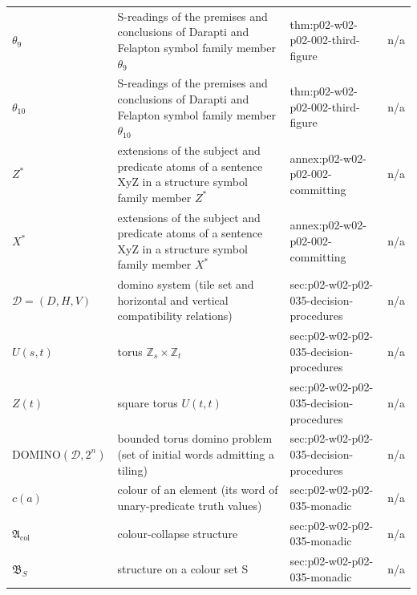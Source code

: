 \begin{longtable}{@{}p{}p{}p{}p{}@{}}
\(\theta_9\) & S-readings of the premises and conclusions of Darapti and Felapton symbol family member \(\theta_9\) & thm:\allowbreak{}p02-\allowbreak{}w02-\allowbreak{}p02-\allowbreak{}002-\allowbreak{}third-\allowbreak{}figure & n/a \\
\(\theta_{10}\) & S-readings of the premises and conclusions of Darapti and Felapton symbol family member \(\theta_{10}\) & thm:\allowbreak{}p02-\allowbreak{}w02-\allowbreak{}p02-\allowbreak{}002-\allowbreak{}third-\allowbreak{}figure & n/a \\
\(Z^\ast\) & extensions of the subject and predicate atoms of a sentence XyZ in a structure symbol family member \(Z^\ast\) & annex:\allowbreak{}p02-\allowbreak{}w02-\allowbreak{}p02-\allowbreak{}002-\allowbreak{}committing & n/a \\
\(X^\ast\) & extensions of the subject and predicate atoms of a sentence XyZ in a structure symbol family member \(X^\ast\) & annex:\allowbreak{}p02-\allowbreak{}w02-\allowbreak{}p02-\allowbreak{}002-\allowbreak{}committing & n/a \\
\(\mathcal D=(D,\allowbreak H,\allowbreak V)\) & domino system (tile set and horizontal and vertical compatibility relations) & sec:\allowbreak{}p02-\allowbreak{}w02-\allowbreak{}p02-\allowbreak{}035-\allowbreak{}decision-\allowbreak{}procedures & n/a \\
\(U(s,\allowbreak t)\) & torus \(\mathbb Z_s\times\mathbb Z_t\) & sec:\allowbreak{}p02-\allowbreak{}w02-\allowbreak{}p02-\allowbreak{}035-\allowbreak{}decision-\allowbreak{}procedures & n/a \\
\(Z(t)\) & square torus \(U(t,t)\) & sec:\allowbreak{}p02-\allowbreak{}w02-\allowbreak{}p02-\allowbreak{}035-\allowbreak{}decision-\allowbreak{}procedures & n/a \\
\(\mathrm{DOMINO}(\mathcal D,\allowbreak 2^n)\) & bounded torus domino problem (set of initial words admitting a tiling) & sec:\allowbreak{}p02-\allowbreak{}w02-\allowbreak{}p02-\allowbreak{}035-\allowbreak{}decision-\allowbreak{}procedures & n/a \\
\(c(a)\) & colour of an element (its word of unary-predicate truth values) & sec:\allowbreak{}p02-\allowbreak{}w02-\allowbreak{}p02-\allowbreak{}035-\allowbreak{}monadic & n/a \\
\(\mathfrak A_{\mathrm{col}}\) & colour-collapse structure & sec:\allowbreak{}p02-\allowbreak{}w02-\allowbreak{}p02-\allowbreak{}035-\allowbreak{}monadic & n/a \\
\(\mathfrak B_S\) & structure on a colour set S & sec:\allowbreak{}p02-\allowbreak{}w02-\allowbreak{}p02-\allowbreak{}035-\allowbreak{}monadic & n/a \\

\end{longtable}
